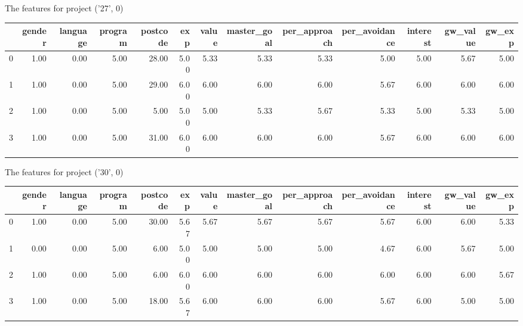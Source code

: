 \documentclass[7pt]{article}
\begin{document}
\begin{landscape}
The features for project ('27', 0)\newline
\begin{tabular}{lrrrrrrrrrrrr}
\toprule
{} &  gender &  language &  program &  postcode &  exp &  value &  master\_goal &  per\_approach &  per\_avoidance &  interest &  gw\_value &  gw\_exp \\
\midrule
0 &    1.00 &      0.00 &     5.00 &     28.00 & 5.00 &   5.33 &         5.33 &          5.33 &           5.00 &      5.00 &             5.67 &           5.00 \\
1 &    1.00 &      0.00 &     5.00 &     29.00 & 6.00 &   6.00 &         6.00 &          6.00 &           5.67 &      6.00 &             6.00 &           6.00 \\
2 &    1.00 &      0.00 &     5.00 &      5.00 & 5.00 &   5.00 &         5.33 &          5.67 &           5.33 &      5.00 &             5.33 &           5.00 \\
3 &    1.00 &      0.00 &     5.00 &     31.00 & 6.00 &   6.00 &         6.00 &          6.00 &           5.67 &      6.00 &             6.00 &           6.00 \\
\bottomrule
\end{tabular}

The features for project ('30', 0)\newline
\begin{tabular}{lrrrrrrrrrrrr}
\toprule
{} &  gender &  language &  program &  postcode &  exp &  value &  master\_goal &  per\_approach &  per\_avoidance &  interest &  gw\_value &  gw\_exp \\
\midrule
0 &    1.00 &      0.00 &     5.00 &     30.00 & 5.67 &   5.67 &         5.67 &          5.67 &           5.67 &      6.00 &             6.00 &           5.33 \\
1 &    0.00 &      0.00 &     5.00 &      6.00 & 5.00 &   5.00 &         5.00 &          5.00 &           4.67 &      6.00 &             5.67 &           5.00 \\
2 &    1.00 &      0.00 &     5.00 &      6.00 & 6.00 &   6.00 &         6.00 &          6.00 &           6.00 &      6.00 &             6.00 &           5.67 \\
3 &    1.00 &      0.00 &     5.00 &     18.00 & 5.67 &   6.00 &         6.00 &          6.00 &           5.67 &      6.00 &             5.00 &           5.00 \\
\bottomrule
\end{tabular}


\end{landscape}
\end{document}
